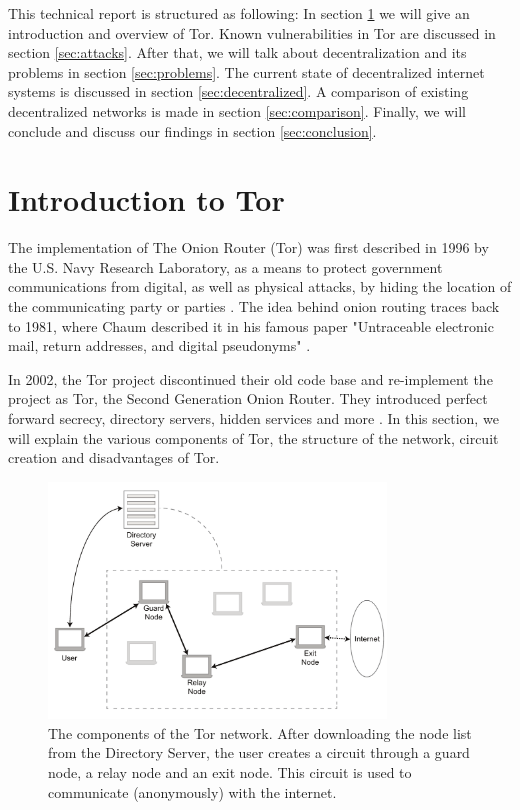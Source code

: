 \documentclass{article}
\begin{document}
	This technical report is structured as following: In section \ref{sec:tor} we will give an introduction and overview of Tor. Known vulnerabilities in Tor are discussed in section \ref{sec:attacks}. After that, we will talk about decentralization and its problems in section \ref{sec:problems}. The current state of decentralized internet systems is discussed in section \ref{sec:decentralized}. A comparison of existing decentralized networks is made in section \ref{sec:comparison}. Finally, we will conclude and discuss our findings in section \ref{sec:conclusion}.
	
\section{Introduction to Tor}
	\label{sec:tor}
	
	The implementation of The Onion Router (Tor) was first described in 1996 by the U.S. Navy Research Laboratory, as a means to protect government communications from digital, as well as physical attacks, by hiding the location of the communicating party or parties \cite{goldschlag1996hiding}. The idea behind onion routing traces back to 1981, where Chaum described it in his famous paper "Untraceable electronic mail, return addresses, and digital pseudonyms" \cite{chaum1981untraceable}.
	
	In 2002, the Tor project discontinued their old code base and re-implement the project as Tor, the Second Generation Onion Router. They introduced perfect forward secrecy, directory servers, hidden services and more \cite{dingledine2004tor}. In this section, we will explain the various components of Tor, the structure of the network, circuit creation and disadvantages of Tor.
	
	\begin{figure}[!t]
		\centering
		\includegraphics[width=0.8\textwidth]{graphics/tor.pdf}
		\caption{The components of the Tor network. After downloading the node list from the Directory Server, the user creates a circuit through a guard node, a relay node and an exit node. This circuit is used to communicate (anonymously) with the internet.}
		\label{fig:tor_layout}
	\end{figure}
\end{document}
